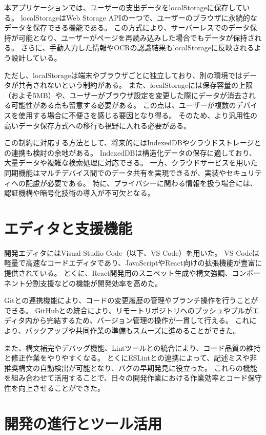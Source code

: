 \documentclass[main]{subfiles}
\begin{document}
本アプリケーションでは、ユーザーの支出データをlocalStorageに保存している。  
localStorageはWeb Storage APIの一つで、ユーザーのブラウザに永続的なデータを保存できる機能である。  
この方式により、サーバーレスでのデータ保持が可能となり、ユーザーがページを再読み込みした場合でもデータが保持される。  
さらに、手動入力した情報やOCRの認識結果もlocalStorageに反映されるよう設計している。

ただし、localStorageは端末やブラウザごとに独立しており、別の環境ではデータが共有されないという制約がある。 
また、localStorageには保存容量の上限（およそ5MB）や、ユーザーがブラウザ設定を変更した際にデータが消去される可能性がある点も留意する必要がある。
この点は、ユーザーが複数のデバイスを使用する場合に不便さを感じる要因となり得る。  
そのため、より汎用性の高いデータ保存方式への移行も視野に入れる必要がある。

この制約に対応する方法として、将来的にはIndexedDBやクラウドストレージとの連携も検討の余地がある。  
IndexedDBは構造化データの保存に適しており、大量データや複雑な検索処理に対応できる。  
一方、クラウドサービスを用いた同期機能はマルチデバイス間でのデータ共有を実現できるが、実装やセキュリティへの配慮が必要である。  
特に、プライバシーに関わる情報を扱う場合には、認証機構や暗号化技術の導入が不可欠となる。

\section{エディタと支援機能}

開発エディタにはVisual Studio Code（以下、VS Code）を用いた。  
VS Codeは軽量で高速なコードエディタであり、JavaScriptやReact向けの拡張機能が豊富に提供されている。  
とくに、React開発用のスニペット生成や構文強調、コンポーネント分割支援などの機能が開発効率を高めた。

Gitとの連携機能により、コードの変更履歴の管理やブランチ操作を行うことができる。  
GitHubとの統合により、リモートリポジトリへのプッシュやプルがエディタ内から完結するため、バージョン管理の操作が一貫して行える。  
これにより、バックアップや共同作業の準備もスムーズに進めることができた。

また、構文補完やデバッグ機能、Lintツールとの統合により、コード品質の維持と修正作業をやりやすくなる。  
とくにESLintとの連携によって、記述ミスや非推奨構文の自動検出が可能となり、バグの早期発見に役立った。  
これらの機能を組み合わせて活用することで、日々の開発作業における作業効率とコード保守性を向上させることができた。

\section{開発の進行とツール活用}
\end{document}
